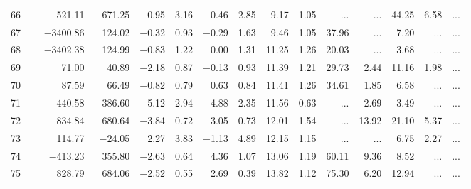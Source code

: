 \begin{table*}[p]
{\begin{tabular}{l@{ }r@{ \ }rr@{ \ }rr@{ \ }rrrr@{ \ }r@{ \ }r@{ \ }r@{ \ }r}
 66   \ \dotfill \  &  $-$521.11 &  $-$671.25 &  $-$0.95 &   3.16 &  $-$0.46 &   2.85
 &    9.17 &   1.05
  &    ...     &    ...     &       44.25 &        6.58 &    ...       \\     
 67   \ \dotfill \  & $-$3400.86 &    124.02 &  $-$0.32 &   0.93 &  $-$0.29 &   1.63
 &    9.46 &   1.05
  &       37.96 &    ...     &        7.20 &    ...     &    ...       \\     
 68   \ \dotfill \  & $-$3402.38 &    124.99 &  $-$0.83 &   1.22 &    0.00 &   1.31
 &   11.25 &   1.26
  &       20.03 &    ...     &        3.68 &    ...     &    ...       \\     
 69   \ \dotfill \  &     71.00 &     40.89 &  $-$2.18 &   0.87 &  $-$0.13 &   0.93
 &   11.39 &   1.21
  &       29.73 &        2.44 &       11.16 &        1.98 &    ...       \\     
 70   \ \dotfill \  &     87.59 &     66.49 &  $-$0.82 &   0.79 &    0.63 &   0.84
 &   11.41 &   1.26
  &       34.61 &        1.85 &        6.58 &    ...     &    ...       \\     
 71   \ \dotfill \  &  $-$440.58 &    386.60 &  $-$5.12 &   2.94 &    4.88 &   2.35
 &   11.56 &   0.63
  &    ...     &        2.69 &        3.49 &    ...     &    ...       \\     
 72   \ \dotfill \  &    834.84 &    680.64 &  $-$3.84 &   0.72 &    3.05 &   0.73
 &   12.01 &   1.54
  &    ...     &       13.92 &       21.10 &        5.37 &    ...       \\     
 73   \ \dotfill \  &    114.77 &   $-$24.05 &    2.27 &   3.83 &  $-$1.13 &   4.89
 &   12.15 &   1.15
  &    ...     &    ...     &        6.75 &        2.27 &    ...       \\     
 74   \ \dotfill \  &  $-$413.23 &    355.80 &  $-$2.63 &   0.64 &    4.36 &   1.07
 &   13.06 &   1.19
  &       60.11 &        9.36 &        8.52 &    ...     &    ...       \\     
 75   \ \dotfill \  &    828.79 &    684.06 &  $-$2.52 &   0.55 &    2.69 &   0.39
 &   13.82 &   1.12
  &       75.30 &        6.20 &       12.94 &    ...     &    ...       \\     
\hline
\end{tabular}
}
\end{table*}

